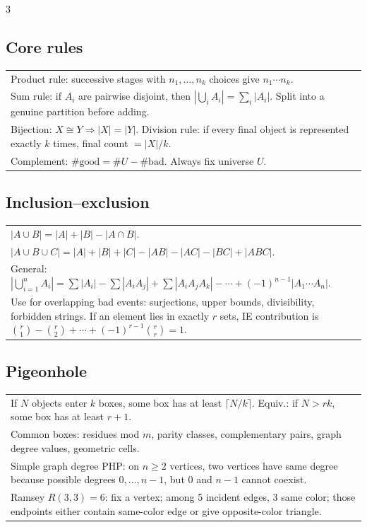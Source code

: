 \documentclass[10pt]{article}
\begin{document}
\begin{multicols*}{3}
\subsection*{Core rules}
\begin{tabular}{@{}p{}@{}}
Product rule: successive stages with \(n_1,\dots,n_k\) choices give \(n_1\cdots n_k\).\\
Sum rule: if \(A_i\) are pairwise disjoint, then \(|\bigcup_i A_i|=\sum_i |A_i|\). Split into a genuine partition before adding.\\
Bijection: \(X\cong Y\Rightarrow |X|=|Y|\). Division rule: if every final object is represented exactly \(k\) times, final count \(=|X|/k\).\\
Complement: \(\#\text{good}=\#U-\#\text{bad}\). Always fix universe \(U\).\\
\end{tabular}

\subsection*{Inclusion--exclusion}
\begin{tabular}{@{}p{}@{}}
\(|A\cup B|=|A|+|B|-|A\cap B|\).\\
\(|A\cup B\cup C|=|A|+|B|+|C|-|AB|-|AC|-|BC|+|ABC|\).\\
General:
\(\left|\bigcup_{i=1}^n A_i\right|
=\sum |A_i|-\sum |A_iA_j|+\sum |A_iA_jA_k|-\cdots+(-1)^{n-1}|A_1\cdots A_n|\).\\
Use for overlapping bad events: surjections, upper bounds, divisibility, forbidden strings. If an element lies in exactly \(r\) sets, IE contribution is \(\binom r1-\binom r2+\cdots+(-1)^{r-1}\binom rr=1\).\\
\end{tabular}

\subsection*{Pigeonhole}
\begin{tabular}{@{}p{}@{}}
If \(N\) objects enter \(k\) boxes, some box has at least \(\lceil N/k\rceil\). Equiv.: if \(N>rk\), some box has at least \(r+1\).\\
Common boxes: residues mod \(m\), parity classes, complementary pairs, graph degree values, geometric cells.\\
Simple graph degree PHP: on \(n\ge2\) vertices, two vertices have same degree because possible degrees \(0,\dots,n-1\), but \(0\) and \(n-1\) cannot coexist.\\
Ramsey \(R(3,3)=6\): fix a vertex; among 5 incident edges, 3 same color; those endpoints either contain same-color edge or give opposite-color triangle.\\
\end{tabular}


\end{multicols*}
\end{document}
